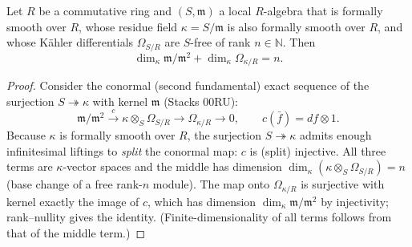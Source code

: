 \begin{theorem}
  \label{pa-thm:conormal_dim_identity}
  \leanok

  Let \(R\) be a commutative ring and \((S, \mathfrak m)\) a local \(R\)-algebra that is
  formally smooth over \(R\), whose residue field \(\kappa = S/\mathfrak m\) is also
  formally smooth over \(R\), and whose K\"ahler differentials \(\Omega_{S/R}\) are
  \(S\)-free of rank \(n \in \mathbb{N}\). Then
  \[
    \dim_\kappa \mathfrak m/\mathfrak m^2 + \dim_\kappa \Omega_{\kappa/R} = n.
  \]
\end{theorem}
\begin{proof}
  \leanok
  Consider the conormal (second fundamental) exact sequence of the surjection
  \(S \twoheadrightarrow \kappa\) with kernel \(\mathfrak m\) (Stacks 00RU):
  \[
    \mathfrak m/\mathfrak m^2 \xrightarrow{\ c\ }
      \kappa \otimes_S \Omega_{S/R} \longrightarrow \Omega_{\kappa/R} \longrightarrow 0,
    \qquad c(\bar f) = df \otimes 1.
  \]
  Because \(\kappa\) is formally smooth over \(R\), the surjection
  \(S \twoheadrightarrow \kappa\) admits enough infinitesimal liftings to \emph{split}
  the conormal map: \(c\) is (split) injective. All three terms are
  \(\kappa\)-vector spaces and the middle has dimension
  \(\dim_\kappa (\kappa \otimes_S \Omega_{S/R}) = n\) (base change of a free rank-\(n\)
  module). The map onto \(\Omega_{\kappa/R}\) is surjective with kernel exactly the
  image of \(c\), which has dimension \(\dim_\kappa \mathfrak m/\mathfrak m^2\) by
  injectivity; rank--nullity gives the identity. (Finite-dimensionality of all terms
  follows from that of the middle term.)
\end{proof}

